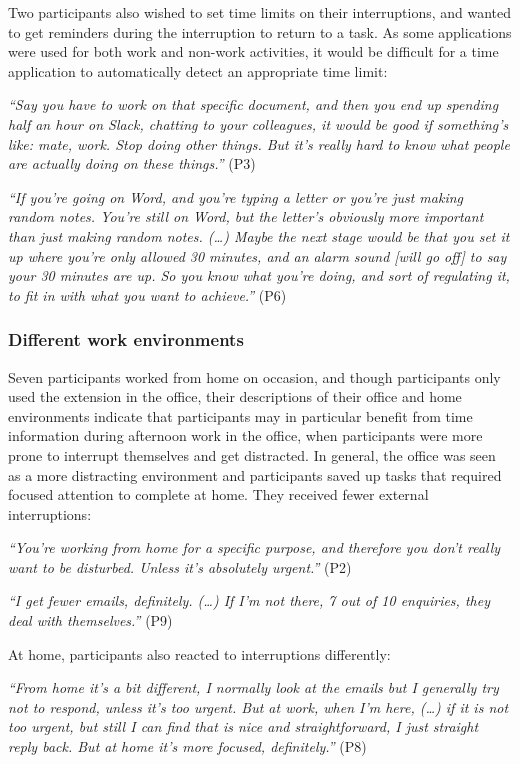 Two participants also wished to set time limits on their interruptions, and wanted to get reminders during the interruption to return to a task. As some applications were used for both work and non-work activities, it would be difficult for a time application to automatically detect an appropriate time limit:

\textit{“Say you have to work on that specific document, and then you end up spending half an hour on Slack, chatting to your colleagues, it would be good if something's like: mate, work. Stop doing other things. But it’s really hard to know what people are actually doing on these things.”} (P3)

\textit{“If you’re going on Word, and you’re typing a letter or you’re just making random notes. You’re still on Word, but the letter’s obviously more important than just making random notes. (…) Maybe the next stage would be that you set it up where you’re only allowed 30 minutes, and an alarm sound [will go off] to say your 30 minutes are up. So you know what you’re doing, and sort of regulating it, to fit in with what you want to achieve.”} (P6)

\subsubsection{Different work environments}
Seven participants worked from home on occasion, and though participants only used the extension in the office, their descriptions of their office and home environments indicate that participants may in particular benefit from time information during afternoon work in the office, when participants were more prone to interrupt themselves and get distracted. In general, the office was seen as a more distracting environment and participants saved up tasks that required focused attention to complete at home. They received fewer external interruptions:

\textit{“You’re working from home for a specific purpose, and therefore you don’t really want to be disturbed. Unless it’s absolutely urgent.”} (P2)
 
\textit{“I get fewer emails, definitely. (…) If I’m not there, 7 out of 10 enquiries, they deal with themselves.”} (P9)

At home, participants also reacted to interruptions differently:

\textit{“From home it’s a bit different, I normally look at the emails but I generally try not to respond, unless it’s too urgent. But at work, when I’m here, (…) if it is not too urgent, but still I can find that is nice and straightforward, I just straight reply back. But at home it’s more focused, definitely.”} (P8)

